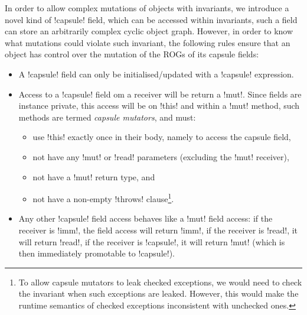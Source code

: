 In order to allow complex mutations of objects with invariants, we introduce a novel kind of \Q!capsule! field, which can be accessed within invariants, such a field can store an arbitrarily complex cyclic object graph. However, in order to know what mutations could violate such invariant, the following rules ensure that an object has control over the mutation of the ROGs of its capsule fields:
\begin{itemize}
	\item A \Q!capsule! field can only be initialised/updated with a \Q!capsule! expression.
	\item Access to a \Q!capsule! field om a \Q@mut@ receiver will be return a \Q!mut!. Since fields are instance private, this access will be on \Q!this! and within a \Q!mut! method, such methods are termed \emph{capsule mutators}, and must:
	\begin{itemize}
		\item use \Q!this! exactly once in their body, namely to access the capsule field,
		\item not have any \Q!mut! or \Q!read! parameters (excluding the \Q!mut! receiver),
		\item not have a \Q!mut! return type, and
		\item not have a non-empty \Q!throws! clause\footnote{To allow capsule mutators to leak checked exceptions, we would need to check the invariant when such exceptions are leaked. However, this would make the runtime semantics of checked exceptions inconsistent with unchecked ones.}.
	\end{itemize}	
	\item Any other \Q!capsule! field access behaves like a \Q!mut! field access: if the receiver is \Q!imm!, the field access will return \Q!imm!, if the receiver is \Q!read!, it will return \Q!read!, if the receiver is \Q!capsule!, it will return \Q!mut! (which is then immediately promotable to \Q!capsule!). %
	
\end{itemize}

